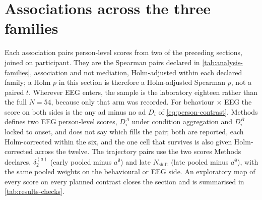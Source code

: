 

\section{Associations across the three families}
\label{sec:results-combos}

Each association pairs person-level scores from two of the preceding sections, joined on participant. They are the Spearman pairs declared in \autoref{tab:analysis-families}, association and not mediation, Holm-adjusted within each declared family; a Holm \(p\) in this section is therefore a Holm-adjusted Spearman \(p\), not a paired \(t\). Wherever EEG enters, the sample is the laboratory eighteen rather than the full \(N=54\), because only that arm was recorded. For behaviour \(\times\) EEG the score on both sides is the any ad minus no ad \(D_i\) of \autoref{eq:person-contrast}. Methods defines two EEG person-level scores, \(D^{A}_{i}\) under condition aggregation and \(D^{B}_{i}\) locked to onset, and does not say which fills the pair; both are reported, each Holm-corrected within the six, and the one cell that survives is also given Holm-corrected across the twelve. The trajectory pairs use the two scores Methods declares, \(\delta^{(a)}_2\) (early pooled minus \(a^{\emptyset}\)) and late \(N_{\mathrm{shift}}\) (late pooled minus \(a^{\emptyset}\)), with the same pooled weights on the behavioural or EEG side. An exploratory map of every score on every planned contrast closes the section and is summarised in \autoref{tab:results-checks}.

